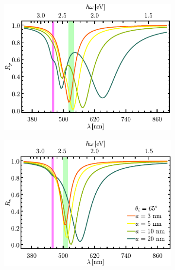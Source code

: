 \begin{figure}[h!]\centering\hspace*{-1.5em}
	\begin{subfigure}{.01\linewidth}\caption{}\label{sfig:R-RVar-cutp}\vspace{4.5cm}\end{subfigure}
	\begin{subfigure}{.45\linewidth}\hspace*{-1.5em}
	\includegraphics[scale=1]{2-Resultados/figs/3-Wp4rVar/cut_angle_65_p.pdf}\end{subfigure}
	\begin{subfigure}{.01\linewidth}\caption{}\label{sfig:R-RVar-cuts}\vspace{4.5cm}\end{subfigure}\hspace*{-1.em}
	\begin{subfigure}{.45\linewidth}\centering
	\includegraphics[scale=1 ]{2-Resultados/figs/3-Wp4rVar/cut_angle_65_s.pdf}\end{subfigure}\vspace*{-.7em}

\end{figure}
